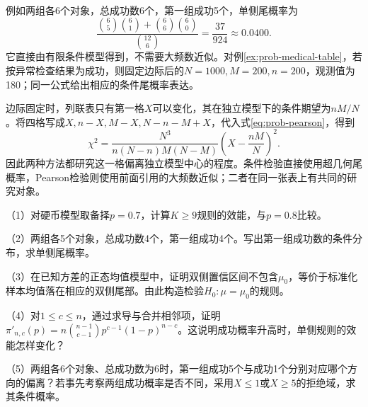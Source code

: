 例如两组各6个对象，总成功数6个，第一组成功5个，单侧尾概率为
\[
 \frac{\binom65\binom61+\binom66\binom60}{\binom{12}6}
 =\frac{37}{924}\approx0.0400.
\]
它直接由有限条件模型得到，不需要大频数近似。对例\ref{ex:prob-medical-table}，若按异常检查结果为成功，则固定边际后的\(N=1000,M=200,n=200\)，观测值为180；同一公式给出相应的条件尾概率表达。

边际固定时，列联表只有第一格\(X\)可以变化，其在独立模型下的条件期望为\(nM/N\)。将四格写成\(X,n-X,M-X,N-n-M+X\)，代入式\eqref{eq:prob-pearson}，得到
\[
 \chi^2=\frac{N^3}{n(N-n)M(N-M)}
 \left(X-\frac{nM}N\right)^2.
\]
因此两种方法都研究这一格偏离独立模型中心的程度。条件检验直接使用超几何尾概率，Pearson检验则使用前面引用的大频数近似；二者在同一张表上有共同的研究对象。

\begin{exercise}
\mbox{}\par\nobreak

（1）对硬币模型取备择\(p=0.7\)，计算\(K\ge9\)规则的效能，与\(p=0.8\)比较。

（2）两组各5个对象，总成功数4个，第一组成功4个。写出第一组成功数的条件分布，求单侧尾概率。

（3）在已知方差的正态均值模型中，证明双侧置信区间不包含\(\mu_0\)，等价于标准化样本均值落在相应的双侧尾部。由此构造检验\(H_0:\mu=\mu_0\)的规则。

（4）对\(1\le c\le n\)，通过求导与合并相邻项，证明\(\pi'_{n,c}(p)=n\binom{n-1}{c-1}p^{c-1}(1-p)^{n-c}\)。这说明成功概率升高时，单侧规则的效能怎样变化？

（5）两组各6个对象、总成功数为6时，第一组成功5个与成功1个分别对应哪个方向的偏离？若事先考察两组成功概率是否不同，采用\(X\le1\)或\(X\ge5\)的拒绝域，求其条件概率。
\end{exercise}
